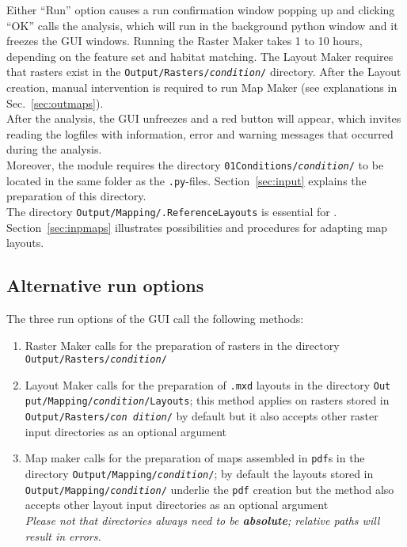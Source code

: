 Either ``Run'' option causes a run confirmation window popping up and clicking ``OK'' calls the analysis, which will run in the background python window and it freezes the GUI windows. Running the Raster Maker takes 1 to 10 hours, depending on the feature set and habitat matching. The Layout Maker requires that rasters exist in the \texttt{Output/Rasters/\textit{condition}/} directory. After the Layout creation, manual intervention is required to run Map Maker (see explanations in Sec.~\ref{sec:outmaps}).\\

After the analysis, the GUI unfreezes and a red button will appear, which invites reading the logfiles with information, error and warning messages that occurred during the analysis.\\

Moreover, the module requires the directory \texttt{01{\myUnderscore}Conditions/\textit{condition}/} to be located in the same folder as the \texttt{.py}-files. Section~\ref{sec:input} explains the preparation of this directory.\\
The directory \texttt{Output/Mapping/.ReferenceLayouts} is essential for . Section~\ref{sec:inpmaps} illustrates possibilities and procedures for adapting map layouts.\\


\subsection{Alternative run options}
\label{sec:lfrun}
The three run options of the GUI call the following methods:
\begin{enumerate}
\item Raster Maker calls  for the preparation of rasters in the directory \texttt{Output/Rasters/\textit{condition}/}
\item Layout Maker calls  for the preparation of \texttt{.mxd} layouts in the directory \texttt{Out put/Mapping/\textit{condition}/Layouts}; this method applies on rasters stored in \texttt{Output/Rasters/\textit{con dition}/} by default but it also accepts other raster input directories as an optional argument
\item Map maker calls  for the preparation of maps assembled in \texttt{pdf}s in the directory \texttt{Output/Mapping/\textit{condition}/}; by default the layouts stored in \texttt{Output/Mapping/\textit{condition}/} underlie the \texttt{pdf} creation but the method also accepts other layout input directories as an optional argument\\
\textit{Please not that directories always need to be \textbf{absolute}; relative paths will result in errors.}
\end{enumerate}

